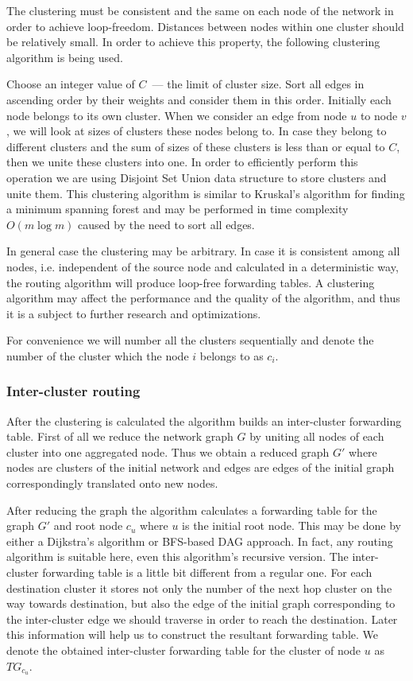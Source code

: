 The clustering must be consistent and the same on each node of the network in order to achieve loop-freedom. Distances between nodes within one cluster should be relatively small. In order to achieve this property, the following clustering algorithm is being used.

Choose an integer value of $C$~--- the limit of cluster size. Sort all edges in ascending order by their weights and consider them in this order. Initially each node belongs to its own cluster. When we consider an edge from node $u$ to node $v$, we will look at sizes of clusters these nodes belong to. In case they belong to different clusters and the sum of sizes of these clusters is less than or equal to $C$, then we unite these clusters into one. In order to efficiently perform this operation we are using Disjoint Set Union data structure to store clusters and unite them. This clustering algorithm is similar to Kruskal's algorithm for finding a minimum spanning forest and may be performed in time complexity $O(m \log m)$ caused by the need to sort all edges.

In general case the clustering may be arbitrary. In case it is consistent among all nodes, i.e. independent of the source node and calculated in a deterministic way, the routing algorithm will produce loop-free forwarding tables. A clustering algorithm may affect the performance and the quality of the algorithm, and thus it is a subject to further research and optimizations.

For convenience we will number all the clusters sequentially and denote the number of the cluster which the node $i$ belongs to as $c_i$.

\subsubsection{Inter-cluster routing}

After the clustering is calculated the algorithm builds an inter-cluster forwarding table. First of all we reduce the network graph $G$ by uniting all nodes of each cluster into one aggregated node. Thus we obtain a reduced graph $G'$ where nodes are clusters of the initial network and edges are edges of the initial graph correspondingly translated onto new nodes.

After reducing the graph the algorithm calculates a forwarding table for the graph $G'$ and root node $c_u$ where $u$ is the initial root node. This may be done by either a Dijkstra's algorithm or BFS-based DAG approach. In fact, any routing algorithm is suitable here, even this algorithm's recursive version. The inter-cluster forwarding table is a little bit different from a regular one. For each destination cluster it stores not only the number of the next hop cluster on the way towards destination, but also the edge of the initial graph corresponding to the inter-cluster edge we should traverse in order to reach the destination. Later this information will help us to construct the resultant forwarding table. We denote the obtained inter-cluster forwarding table for the cluster of node $u$ as $TG_{c_u}$.

